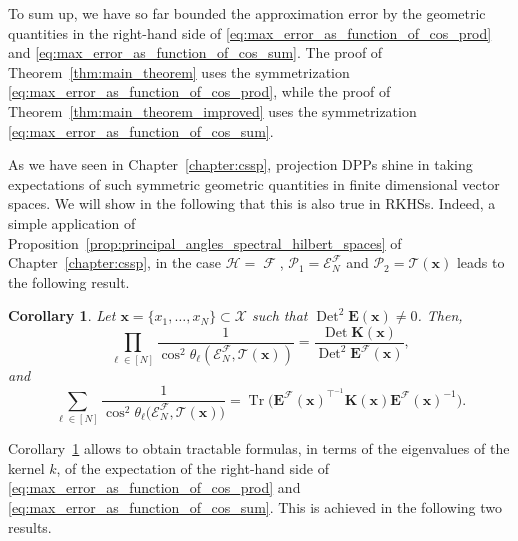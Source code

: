 \documentclass[twoside,11pt]{book}
\newtheorem{corollary}{Corollary}
\numberwithin{theorem}{chapter}
\numberwithin{definition}{chapter}
\numberwithin{proposition}{chapter}
\numberwithin{corollary}{chapter}
\numberwithin{example}{chapter}
\numberwithin{lemma}{chapter}
\numberwithin{assumption}{chapter}
\DeclareMathOperator{\Tr}{Tr}
\DeclareMathOperator{\Det}{Det}
\DeclareMathOperator{\Tran}{\intercal}
\DeclareMathOperator{\F}{\mathcal{F}}
\begin{document}
To sum up, we have so far bounded the approximation error by the geometric quantities in the right-hand side of \eqref{eq:max_error_as_function_of_cos_prod} and \eqref{eq:max_error_as_function_of_cos_sum}.
The proof of Theorem~\ref{thm:main_theorem} uses the symmetrization \eqref{eq:max_error_as_function_of_cos_prod}, while
the proof of Theorem~\ref{thm:main_theorem_improved} uses the symmetrization \eqref{eq:max_error_as_function_of_cos_sum}.

As we have seen in Chapter~\ref{chapter:cssp}, projection DPPs shine in taking expectations of such symmetric geometric quantities in finite dimensional vector spaces. We will show in the following that this is also true in RKHSs. Indeed, a simple application of Proposition~\ref{prop:principal_angles_spectral_hilbert_spaces} of Chapter~\ref{chapter:cssp}, in the case $\mathcal{H} = \F$, $\mathcal{P}_{1} = \mathcal{E}_{N}^{\F}$ and $\mathcal{P}_{2} = \mathcal{T}(\bm{x})$ leads to the following result.



\begin{corollary}\label{cor:cos_ratio_det}
Let $\bm{x} =  \{ x_{1}, \dots , x_{N}\} \subset \mathcal{X}$ such that $\Det^{2} \bm{E}(\bm{x}) \neq 0$. Then,
\begin{equation}
\prod\limits_{\ell \in [N]} \frac{1}{\cos^{2} \theta_{\ell} \left(\mathcal{E}^{\mathcal{F}}_{N}, \mathcal{T}(\bm{x}) \right)} = \frac{\Det \bm{K}(\bm{x})}{\Det^{2} \bm{E}^{\mathcal{F}}(\bm{x})},
\end{equation}
and
\begin{equation}
\sum\limits_{\ell \in [N]} \frac{1}{\cos^{2} \theta_{\ell} \bigg(\mathcal{E}^{\mathcal{F}}_{N}, \mathcal{T}(\bm{x}) \bigg)} = \Tr \bigg(\bm{E}^{\mathcal{F}}(\bm{x})^{\Tran^{-1}}  \bm{K}(\bm{x}) \bm{E}^{\mathcal{F}}(\bm{x})^{-1} \bigg).
\end{equation}
\end{corollary}





Corollary~\ref{cor:cos_ratio_det} allows to obtain tractable formulas, in terms of the eigenvalues of the kernel $k$, of the expectation of the right-hand side of \eqref{eq:max_error_as_function_of_cos_prod} and \eqref{eq:max_error_as_function_of_cos_sum}.
This is achieved in the following two results.
\end{document}
